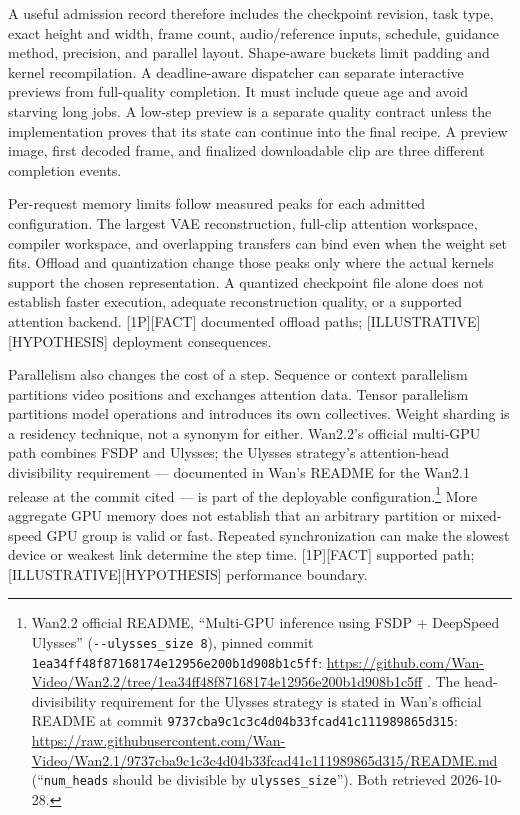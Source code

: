 A useful admission record therefore includes the checkpoint revision,
task type, exact height and width, frame count, audio/reference inputs,
schedule, guidance method, precision, and parallel layout. Shape-aware
buckets limit padding and kernel recompilation. A deadline-aware
dispatcher can separate interactive previews from full-quality
completion. It must include queue age and avoid starving long jobs. A
low-step preview is a separate quality contract unless the
implementation proves that its state can continue into the final recipe.
A preview image, first decoded frame, and finalized downloadable clip
are three different completion events.

Per-request memory limits follow measured peaks for each admitted
configuration. The largest VAE reconstruction, full-clip attention
workspace, compiler workspace, and overlapping transfers can bind even
when the weight set fits. Offload and quantization change those peaks
only where the actual kernels support the chosen representation. A
quantized checkpoint file alone does not establish faster execution,
adequate reconstruction quality, or a supported attention backend.
\mbox{{[}1P{]}}\hspace{0pt}\mbox{{[}FACT{]}} documented offload paths;
\mbox{{[}ILLUSTRATIVE{]}}\hspace{0pt}\mbox{{[}HYPOTHESIS{]}} deployment consequences.

Parallelism also changes the cost of a step. Sequence or context
parallelism partitions video positions and exchanges attention data.
Tensor parallelism partitions model operations and introduces its own
collectives. Weight sharding is a residency technique, not a synonym for
either. Wan2.2's official multi-GPU path combines FSDP and Ulysses; the
Ulysses strategy's attention-head divisibility requirement ---
documented in Wan's README for the Wan2.1 release at the commit cited
--- is part of the deployable configuration.\footnote{Wan2.2 official
  README, ``Multi-GPU inference using FSDP + DeepSpeed Ulysses''
  (\texttt{-\/-ulysses\_size\ 8}), pinned commit
  \texttt{1ea34ff48f87168174e12956e200b1d908b1c5ff}:
  \url{https://github.com/Wan-Video/Wan2.2/tree/1ea34ff48f87168174e12956e200b1d908b1c5ff}
  . The head-divisibility requirement for the Ulysses strategy is stated
  in Wan's official README at commit
  \texttt{9737cba9c1c3c4d04b33fcad41c111989865d315}:
  \url{https://raw.githubusercontent.com/Wan-Video/Wan2.1/9737cba9c1c3c4d04b33fcad41c111989865d315/README.md}
  (``\texttt{num\_heads} should be divisible by
  \texttt{ulysses\_size}''). Both retrieved 2026-10-28.} More aggregate
GPU memory does not establish that an arbitrary partition or mixed-speed
GPU group is valid or fast. Repeated synchronization can make the
slowest device or weakest link determine the step time.
\mbox{{[}1P{]}}\hspace{0pt}\mbox{{[}FACT{]}} supported path; \mbox{{[}ILLUSTRATIVE{]}}\hspace{0pt}\mbox{{[}HYPOTHESIS{]}}
performance boundary.

